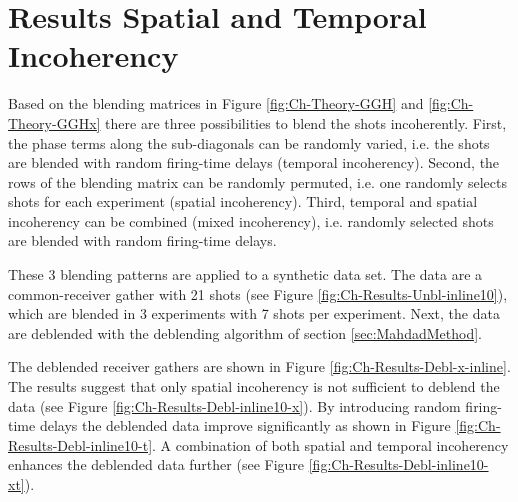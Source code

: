 \FloatBarrier

\section{Results Spatial and Temporal Incoherency}

Based on the blending matrices in Figure \ref{fig:Ch-Theory-GGH} and \ref{fig:Ch-Theory-GGHx} there are three possibilities to blend the shots incoherently. First, the phase terms along the sub-diagonals can be randomly varied, i.e. the shots are blended with random firing-time delays (temporal incoherency). Second, the rows of the blending matrix can be randomly permuted, i.e. one randomly selects shots for each experiment (spatial incoherency). Third, temporal and spatial incoherency can be combined (mixed incoherency), i.e. randomly selected shots are blended with random firing-time delays.

These 3 blending patterns are applied to a synthetic data set. The data are a common-receiver gather with 21 shots (see Figure \ref{fig:Ch-Results-Unbl-inline10}), which are blended in 3 experiments with 7 shots per experiment. Next, the data are deblended with the deblending algorithm of section \ref{sec:MahdadMethod}. 

The deblended receiver gathers are shown in Figure \ref{fig:Ch-Results-Debl-x-inline}. The results suggest that only spatial incoherency is not sufficient to deblend the data (see Figure \ref{fig:Ch-Results-Debl-inline10-x}). By introducing random firing-time delays the deblended data improve significantly as shown in Figure \ref{fig:Ch-Results-Debl-inline10-t}. A combination of both spatial and temporal incoherency enhances the deblended data further (see Figure \ref{fig:Ch-Results-Debl-inline10-xt}).


